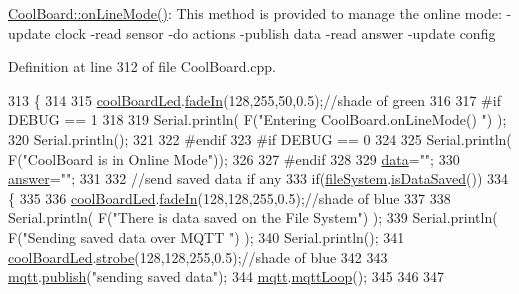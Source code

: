 \hyperlink{class_cool_board_aa0bbc4bc605e35618d18e68795c61363}{Cool\+Board\+::on\+Line\+Mode()}\+: This method is provided to manage the online mode\+: -\/update clock -\/read sensor -\/do actions -\/publish data -\/read answer -\/update config 

Definition at line 312 of file Cool\+Board.\+cpp.


\begin{DoxyCode}
313 \{
314 
315     \hyperlink{class_cool_board_a1b1d3c684a5baa56b08486e192fd8e97}{coolBoardLed}.\hyperlink{class_cool_board_led_ab778f5e7bed0ab74e3906d82110493c3}{fadeIn}(128,255,50,0.5);\textcolor{comment}{//shade of green}
316 
317 \textcolor{preprocessor}{#if DEBUG == 1}
318 
319     Serial.println( F(\textcolor{stringliteral}{"Entering CoolBoard.onLineMode() "}) );
320     Serial.println();
321 
322 \textcolor{preprocessor}{#endif}
323 \textcolor{preprocessor}{#if DEBUG == 0}
324 
325     Serial.println( F(\textcolor{stringliteral}{"CoolBoard is in Online Mode"}));
326 
327 \textcolor{preprocessor}{#endif}
328 
329     \hyperlink{class_cool_board_a427fb753dd8575bdf821c70a5c63d695}{data}=\textcolor{stringliteral}{""};
330     \hyperlink{class_cool_board_a7b835fafd449e5282f7f91d787a2dc15}{answer}=\textcolor{stringliteral}{""};
331 
332     \textcolor{comment}{//send saved data if any}
333     \textcolor{keywordflow}{if}(\hyperlink{class_cool_board_a42c2586fbb13ff7f06538e9284e8538d}{fileSystem}.\hyperlink{class_cool_file_system_ac86a40e7c3a1842f7342f698d34324f9}{isDataSaved}())
334     \{
335 
336         \hyperlink{class_cool_board_a1b1d3c684a5baa56b08486e192fd8e97}{coolBoardLed}.\hyperlink{class_cool_board_led_ab778f5e7bed0ab74e3906d82110493c3}{fadeIn}(128,128,255,0.5);\textcolor{comment}{//shade of blue}
337 
338         Serial.println( F(\textcolor{stringliteral}{"There is data saved on the File System"}) );
339         Serial.println( F(\textcolor{stringliteral}{"Sending saved data over MQTT "}) );
340         Serial.println();
341         \hyperlink{class_cool_board_a1b1d3c684a5baa56b08486e192fd8e97}{coolBoardLed}.\hyperlink{class_cool_board_led_ad5f0de4c628cbfbf49896042831c64ad}{strobe}(128,128,255,0.5);\textcolor{comment}{//shade of blue }
342 
343         \hyperlink{class_cool_board_a2399f44d7c23c1149a335cb3b46d90f1}{mqtt}.\hyperlink{class_cool_m_q_t_t_ace977b3e90ab14b1199fe5c4fb0a13ec}{publish}(\textcolor{stringliteral}{"sending saved data"});
344         \hyperlink{class_cool_board_a2399f44d7c23c1149a335cb3b46d90f1}{mqtt}.\hyperlink{class_cool_m_q_t_t_aa5eaae967b562b62cbcf2b8d81f6e5d5}{mqttLoop}();
345 
346 
347         

\end{DoxyCode}
